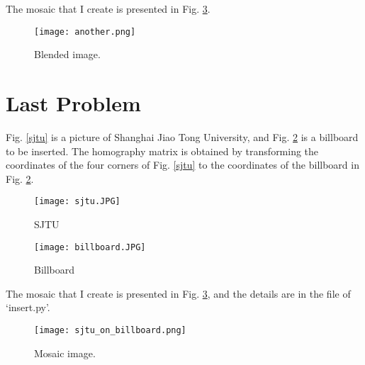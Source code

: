 \documentclass[UTF8,a4paper,10pt]{ctexart}
\begin{document}
The mosaic that I create is presented in Fig. \ref{key}.
\begin{figure}[H]
\centerline{\texttt{[image: another.png]}}
\caption{Blended image.}
\label{key}
\end{figure}

\section{Last Problem}
Fig. \ref{sjtu} is a picture of Shanghai Jiao Tong University, and Fig. \ref{bb} is a billboard to be inserted.
The homography matrix is obtained by transforming the coordinates of the four corners of Fig. \ref{sjtu} to the coordinates of the billboard in Fig. \ref{bb}.
\begin{figure}[H]
	\centering
	\begin{minipage}[t]{0,40\textwidth}	
		\centering
		\texttt{[image: sjtu.JPG]} %
		\caption{SJTU} %
		\label{sjtu} %
	\end{minipage}
	\hfil
	\begin{minipage}[t]{0,40\textwidth}	
		\centering
		\texttt{[image: billboard.JPG]} %
		\caption{Billboard} %
		\label{bb} %
	\end{minipage}
\end{figure}

The mosaic that I create is presented in Fig. \ref{key}, and the details are in the file of `insert.py'.
\begin{figure}[H]
\centerline{\texttt{[image: sjtu\_on\_billboard.png]}}
\caption{Mosaic image.}
\label{key}
\end{figure}




\end{document}
